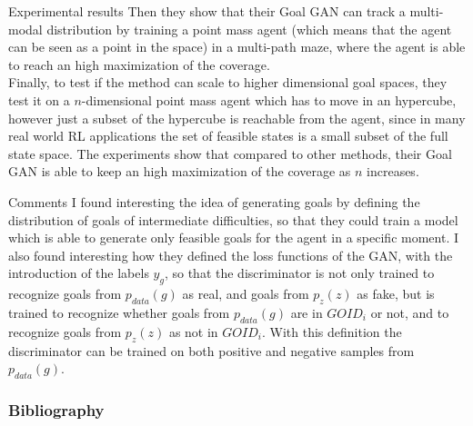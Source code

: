 \documentclass{beamer}
\begin{document}
	
	\begin{frame}{Experimental results}
		Then they show that their Goal GAN can track a multi-modal distribution by training a point mass agent (which means that the agent can be seen as a point in the space) in a multi-path maze, where the agent is able to reach an high maximization of the coverage.\\
		Finally, to test if the method can scale to higher dimensional goal spaces, they test it on a $n$-dimensional point mass agent which has to move in an hypercube, however just a subset of the hypercube is reachable from the agent, since in many real world RL applications the set of feasible states is a small subset of the full state space. The experiments show that compared to other methods, their Goal GAN is able to keep an high maximization of the coverage as $n$ increases. 
	\end{frame}


	\begin{frame}{Comments}
		I found interesting the idea of generating goals by defining the distribution of goals of intermediate difficulties, so that they could train a model which is able to generate only feasible goals for the agent in a specific moment. I also found interesting how they defined the loss functions of the GAN, with the introduction of the labels $y_g$, so that the discriminator is not only trained to recognize goals from $p_{data}(g)$ as real, and goals from $p_z(z)$ as fake, but is trained to recognize whether goals from $p_{data}(g)$ are in $GOID_i$ or not, and to recognize goals from $p_z(z)$ as not in $GOID_i$. With this definition the discriminator can be trained on both positive and negative samples from $p_{data}(g)$.
	\end{frame}	
	
	
	\begin{frame}
		\frametitle{Bibliography}
		\footnotesize
		\nocite{florensa2018automatic}
		\nocite{mao2017least}
		\nocite{duan2016benchmarking}
		
		
	\end{frame}
	
	
\end{document}
